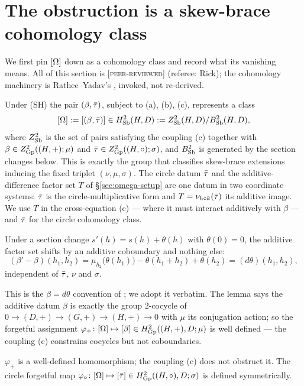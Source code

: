 \section{The obstruction is a skew-brace cohomology class}\label{sec:omega-identify}

We first pin $[\Omega]$ down as a cohomology class and record what its vanishing means.
All of this section is \textsc{[peer-reviewed]} (referee: Rick); the cohomology
machinery is Rathee--Yadav's \cite{RatheeYadavExt}, invoked, not
re-derived.

Under (SH) the pair $(\beta,\bar\tau)$, subject to (a), (b), (c), represents a class
\[
   [\Omega] := [(\beta,\bar\tau)] \in H^2_{\mathrm{Sb}}(H,D)
     := Z^2_{\mathrm{Sb}}(H,D)/B^2_{\mathrm{Sb}}(H,D),
\]
where $Z^2_{\mathrm{Sb}}$ is the set of pairs satisfying the coupling (c) together with
$\beta\in Z^2_{\mathrm{Gp}}((H,+);\mu)$ and $\bar\tau\in Z^2_{\mathrm{Gp}}((H,\circ);\sigma)$, and
$B^2_{\mathrm{Sb}}$ is generated by the section changes below. This is exactly the group
that classifies skew-brace extensions inducing the fixed triplet
$(\nu,\mu,\sigma)$. The circle datum $\bar\tau$ and the additive-difference factor
set $T$ of \S\ref{sec:omega-setup} are one datum in two coordinate systems:
$\bar\tau$ is the circle-multiplicative form and $T=\nu_{h\circ k}(\bar\tau)$ its
additive image. We use $T$ in the cross-equation (c) --- where it must interact
additively with $\beta$ --- and $\bar\tau$ for the circle cohomology class.

\begin{lemma}[Additive coboundary; $\beta=d\theta$]\label{lem:beta-cobound}
Under a section change $s'(h)=s(h)+\theta(h)$ with $\theta(0)=0$, the additive
factor set shifts by an additive coboundary and nothing else:
\[
   (\beta'-\beta)(h_1,h_2)=\mu_{h_2}\bigl(\theta(h_1)\bigr)-\theta(h_1{+}h_2)
   +\theta(h_2)=(d\theta)(h_1,h_2),
\]
independent of $\bar\tau$, $\nu$ and $\sigma$.
\end{lemma}

This is the $\beta=d\theta$ convention of \cite{RatheeYadavExt}; we adopt it
verbatim. The lemma says the additive datum $\beta$ is exactly the group
$2$-cocycle of $0\to(D,+)\to(G,+)\to(H,+)\to0$ with $\mu$ its conjugation action;
so the forgetful assignment $\varphi_+\colon[\Omega]\mapsto[\beta]\in
H^2_{\mathrm{Gp}}((H,+),D;\mu)$ is well defined --- the coupling (c) constrains cocycles
but not coboundaries.

\begin{theorem}
\label{thm:phiplus}
$\varphi_+$ is a well-defined homomorphism; the coupling (c) does not obstruct it.
The circle forgetful map $\varphi_\circ\colon[\Omega]\mapsto[\bar\tau]\in
H^2_{\mathrm{Gp}}((H,\circ),D;\sigma)$ is defined symmetrically.
\end{theorem}


